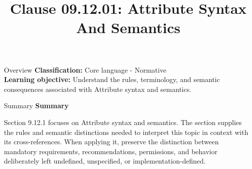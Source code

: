 \documentclass[10pt,letterpaper]{article}
\title{Clause 09.12.01: Attribute Syntax And Semantics}
\author{}
\date{}
\begin{document}
\maketitle
\begin{CornellOverviewBox}{Overview}
\textbf{Classification:} Core language - Normative\\[2pt]
\textbf{Learning objective:} Understand the rules, terminology, and semantic consequences associated with Attribute syntax and semantics.
\end{CornellOverviewBox}\begin{CornellSummaryBox}{Summary}
{\sffamily\bfseries\color{Accent} Summary}\par\vspace{3pt}Section 9.12.1 focuses on Attribute syntax and semantics. The section supplies the rules and semantic distinctions needed to interpret this topic in context with its cross-references. When applying it, preserve the distinction between mandatory requirements, recommendations, permissions, and behavior deliberately left undefined, unspecified, or implementation-defined.
\end{CornellSummaryBox}
\end{document}
